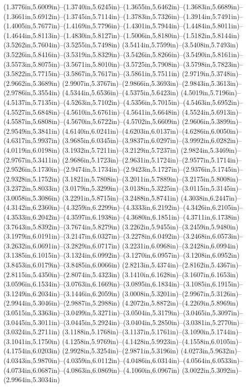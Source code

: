 (1.3776in,5.6009in)--(1.3740in,5.6245in)--(1.3655in,5.6462in)--(1.3683in,5.6689in)--(1.3661in,5.6912in)--(1.3745in,5.7114in)--(1.3783in,5.7326in)--(1.3914in,5.7491in)--(1.4005in,5.7677in)--(1.4169in,5.7796in)--(1.4301in,5.7944in)--(1.4484in,5.8011in)--(1.4644in,5.8113in)--(1.4830in,5.8127in)--(1.5006in,5.8180in)--(1.5182in,5.8144in) (3.5262in,5.7604in)--(3.5255in,5.7498in) (3.5414in,5.7599in)--(3.5408in,5.7493in) (3.5226in,5.8416in)--(3.5319in,5.8329in)--(3.5426in,5.8266in)--(3.5490in,5.8161in)--(3.5573in,5.8075in)--(3.5671in,5.8010in)--(3.5725in,5.7908in)--(3.5798in,5.7823in)--(3.5822in,5.7715in)--(3.5867in,5.7617in)--(3.5861in,5.7511in) (2.9719in,5.3748in)--(2.9662in,5.3689in) (2.9907in,5.3767in)--(2.9866in,5.3693in)--(2.9843in,5.3613in)--(2.9786in,5.3554in) (4.5344in,5.6536in)--(4.5375in,5.6423in) (4.5019in,5.7196in)--(4.5137in,5.7135in)--(4.5263in,5.7102in)--(4.5356in,5.7015in)--(4.5463in,5.6952in)--(4.5527in,5.6848in)--(4.5610in,5.6761in)--(4.5641in,5.6648in) (4.5524in,5.6913in)--(4.5587in,5.6808in)--(4.5670in,5.6722in)--(4.5702in,5.6609in) (2.9606in,5.3899in)--(2.9549in,5.3841in) (4.6140in,6.0241in)--(4.6203in,6.0137in)--(4.6286in,6.0050in)--(4.6317in,5.9937in) (3.9685in,6.0345in)--(3.9837in,6.0297in)--(3.9992in,6.0282in)--(4.0119in,6.0198in) (3.1932in,5.7211in)--(3.2129in,5.7237in) (2.9824in,5.3469in)--(2.9767in,5.3411in) (2.9686in,5.1723in)--(2.9631in,5.1724in)--(2.9577in,5.1714in)--(2.9526in,5.1730in)--(2.9474in,5.1734in)--(2.9423in,5.1727in)--(2.9376in,5.1745in)--(2.9328in,5.1752in) (3.1821in,5.7808in)--(3.2011in,5.7889in)--(3.2175in,5.8008in)--(3.2372in,5.8033in) (3.0179in,5.3299in)--(3.0138in,5.3225in)--(3.0115in,5.3145in)--(3.0058in,5.3086in) (3.2291in,5.8715in)--(3.2488in,5.8741in) (4.3038in,6.2447in)--(4.3142in,6.2360in)--(4.3259in,6.2299in)--(4.3333in,6.2192in)--(4.3426in,6.2105in)--(4.3533in,6.2042in)--(4.3597in,6.1938in)--(4.3680in,6.1851in)--(4.3711in,6.1738in) (3.7643in,5.8392in)--(3.7674in,5.8279in) (3.2262in,5.9455in)--(3.2459in,5.9480in) (3.1979in,6.0191in)--(3.2147in,6.0327in)--(3.2278in,6.0492in)--(3.2468in,6.0573in)--(3.2632in,6.0691in)--(3.2829in,6.0717in) (3.2231in,6.0968in)--(3.2428in,6.0994in) (3.1385in,6.1015in)--(3.1324in,6.0992in)--(3.1270in,6.0957in)--(3.1208in,6.0952in) (3.8453in,6.0179in)--(3.8485in,6.0066in) (2.8213in,5.4374in)--(2.8162in,5.4367in)--(2.8115in,5.4350in)--(2.8074in,5.4323in) (3.1410in,6.1628in)--(3.1607in,6.1653in) (3.0596in,6.1534in)--(3.0763in,6.1669in)--(3.0895in,6.1834in)--(3.1085in,6.1915in)--(3.1249in,6.2034in)--(3.1446in,6.2059in) (3.0008in,5.3201in)--(2.9967in,5.3126in)--(2.9944in,5.3046in)--(2.9887in,5.2988in) (4.2072in,5.8872in)--(4.2269in,5.8969in) (3.0515in,5.3363in)--(3.0499in,5.3271in)--(3.0504in,5.3179in)--(3.0465in,5.3097in)--(3.0445in,5.3011in)--(3.0445in,5.2924in)--(3.0404in,5.2850in)--(3.0381in,5.2770in)--(3.0324in,5.2711in) (3.1188in,5.1768in)--(3.1137in,5.1761in)--(3.1090in,5.1744in)--(3.1041in,5.1750in) (4.1258in,5.9769in)--(4.1428in,5.9923in)--(4.1558in,6.0105in)--(4.1754in,6.0203in) (2.9928in,5.3254in)--(2.9871in,5.3196in) (4.0273in,5.9632in)--(4.0343in,5.9870in)--(4.0359in,6.0112in)--(4.0486in,6.0314in)--(4.0564in,6.0533in)--(4.0734in,6.0687in)--(4.0863in,6.0869in)--(4.1060in,6.0967in) (3.0022in,5.3092in)--(2.9964in,5.3034in) 